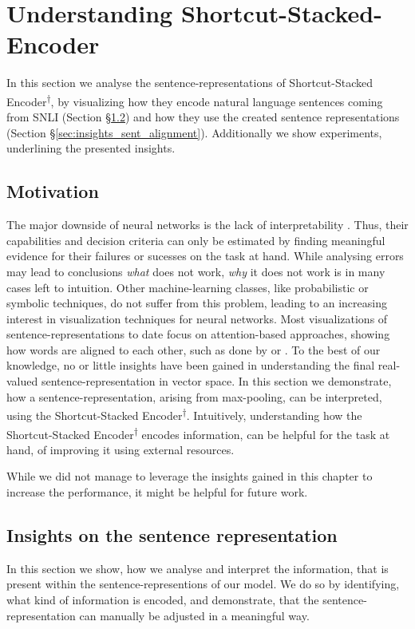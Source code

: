 \section{Understanding Shortcut-Stacked-Encoder}\label{sec:understanding}
In this section we analyse the sentence-representations of Shortcut-Stacked Encoder\textsuperscript{$\dagger$}, by visualizing how they encode natural language sentences coming from \ac{SNLI} (Section §\ref{sec:insights_sent_repr}) and how they use the created sentence representations (Section §\ref{sec:insights_sent_alignment}). Additionally we show experiments, underlining the presented insights.
\subsection{Motivation}
The major downside of neural networks is the lack of interpretability \citep{goldberg2017Apr}. Thus, their capabilities and decision criteria can only be estimated by finding meaningful evidence for their failures or sucesses on the task at hand. While analysing errors may lead to conclusions \textit{what} does not work, \textit{why} it does not work is in many cases left to intuition. Other machine-learning classes, like probabilistic or symbolic techniques, do not suffer from this problem, leading to an increasing interest in visualization techniques for neural networks. Most visualizations of sentence-representations to date focus on attention-based approaches, showing how words are aligned to each other, such as done by \cite{shen2018reinforced} or \cite{im2017distance}. To the best of our knowledge, no or little insights have been gained in understanding the final real-valued sentence-representation in vector space. In this section we demonstrate, how a sentence-representation, arising from max-pooling, can be interpreted, using the Shortcut-Stacked Encoder\textsuperscript{$\dagger$}. Intuitively, understanding how the Shortcut-Stacked Encoder\textsuperscript{$\dagger$} encodes information, can be helpful for the task at hand, of improving it using external resources. 
\newline

\noindent
While we did not manage to leverage the insights gained in this chapter to increase the performance, it might be helpful for future work.

\subsection{Insights on the sentence representation}\label{sec:insights_sent_repr}
In this section we show, how we analyse and interpret the information, that is present within the sentence-representions of our model. We do so by identifying, what kind of information is encoded, and demonstrate, that the sentence-representation can manually be adjusted in a meaningful way.
